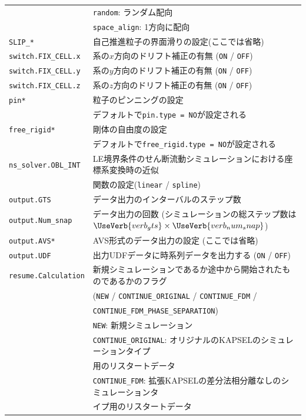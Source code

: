 \documentclass[pdflatex,a4paper,10pt,ja=standard]{bxjsarticle}
\begin{document}
\begin{longtable}{ll}
    & \verb|random|: ランダム配向 \\
    & \verb|space_align|: 1方向に配向 \\
    \verb|SLIP_*| & 自己推進粒子の界面滑りの設定(ここでは省略)\\
    \verb|switch.FIX_CELL.x| & 系の$x$方向のドリフト補正の有無 (\verb|ON| / \verb|OFF|)\\
    \verb|switch.FIX_CELL.y| & 系の$y$方向のドリフト補正の有無 (\verb|ON| / \verb|OFF|)\\
    \verb|switch.FIX_CELL.z| & 系の$z$方向のドリフト補正の有無 (\verb|ON| / \verb|OFF|)\\
    \verb|pin*| & 粒子のピンニングの設定\\
    & デフォルトで\verb|pin.type = NO|が設定される\\
    \verb|free_rigid*| & 剛体の自由度の設定\\
    & デフォルトで\verb|free_rigid.type = NO|が設定される\\
    \verb|ns_solver.OBL_INT| & LE境界条件のせん断流動シミュレーションにおける座標系変換時の近似\\
    & 関数の設定(\verb|linear| / \verb|spline|)\\
    \verb|output.GTS| & データ出力のインターバルのステップ数\\
    \verb|output.Num_snap| & データ出力の回数 (シミュレーションの総ステップ数は$\UseVerb{verb_gts}\times\UseVerb{verb_num_snap}$)\\
    \verb|output.AVS*| & AVS形式のデータ出力の設定 (ここでは省略)\\
    \verb|output.UDF| & 出力UDFデータに時系列データを出力する (\verb|ON| / \verb|OFF|)\\
    \verb|resume.Calculation| & 新規シミュレーションであるか途中から開始されたものであるかのフラグ \\
    & (\verb|NEW| / \verb|CONTINUE_ORIGINAL| / \verb|CONTINUE_FDM| / \\
    & \verb|CONTINUE_FDM_PHASE_SEPARATION|)\\
    & \verb|NEW|: 新規シミュレーション \\
    & \verb|CONTINUE_ORIGINAL|: オリジナルのKAPSELのシミュレーションタイプ\\
    & \hspace{21.5ex} 用のリスタートデータ\\
    & \verb|CONTINUE_FDM|: 拡張KAPSELの差分法相分離なしのシミュレーションタ\\
    & \hspace{15.5ex} イプ用のリスタートデータ\\

\end{longtable}
\end{document}

